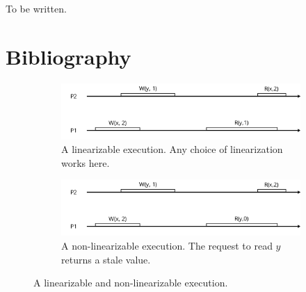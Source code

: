 \documentclass[]             %
{NASA}                       %
\theoremstyle{definition}
\begin{document}
To be written.

\section*{Bibliography}\label{bibliography}





\begin{figure}[p]
  \begin{subfigure}[a]{1\textwidth} \center
    \includegraphics[scale=0.4]{images/linear1.png} \caption{A
      linearizable execution. Any choice of linearization works here.}
    \label{fig:linear_example11} \end{subfigure}
  \begin{subfigure}[b]{1\textwidth} \center
    \includegraphics[scale=0.4]{images/nonlinear0.png} \caption{A
      non-linearizable execution. The request to read $y$ returns a
      stale value. } \label{fig:linear_example12} \end{subfigure}
  \caption{A linearizable and non-linearizable execution.}
  \label{fig:linear_example1} \end{figure}
\end{document}
